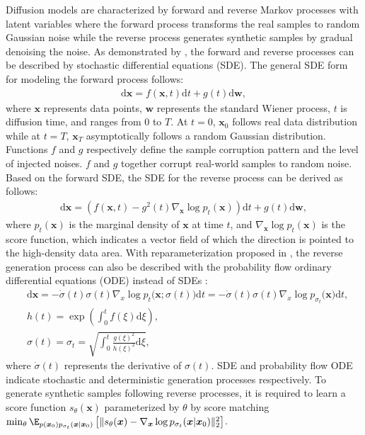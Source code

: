 Diffusion models are characterized by forward and reverse Markov processes with latent variables where the forward process transforms the real samples to random Gaussian noise while the reverse process generates synthetic samples by gradual denoising the noise. As demonstrated by \citet{song2021scorebased}, the forward and reverse processes can be described by stochastic differential equations (SDE). The general SDE form for modeling the forward process follows:
\begin{align}
    \mathrm{d}\boldsymbol{x} = f(\boldsymbol{x}, t)\mathrm{d}t + g(t)\mathrm{d}\boldsymbol{w},
\end{align}
where $\boldsymbol{x}$ represents data points, $\boldsymbol{w}$ represents the standard Wiener process, $t$ is diffusion time, and ranges from $0$ to $T$. At $t=0$, $\boldsymbol{x}_0$ follows real data distribution while at $t=T$, $\boldsymbol{x}_T$ asymptotically follows a random Gaussian distribution. Functions $f$ and $g$ respectively define the sample corruption pattern and the level of injected noises. $f$ and $g$ together corrupt real-world samples to random noise. Based on the forward SDE, the SDE for the reverse process can be derived as follows:
\begin{align}
    \mathrm{d}\boldsymbol{x} = \left(f(\boldsymbol{x}, t)-g^2(t)\nabla_{\boldsymbol{x}}\log p_t(\boldsymbol{x})\right)\mathrm{d}t + g(t)\mathrm{d}\boldsymbol{w},
\end{align}
where $p_t(\boldsymbol{x})$ is the marginal density of $\boldsymbol{x}$ at time $t$, and $\nabla_{\boldsymbol{x}}\log p_t(\boldsymbol{x})$ is the score function, which indicates a vector field of which the direction is pointed to the high-density data area. 
With reparameterization proposed in \citet{Karras2022edm}, the reverse generation process can also be described with the probability flow ordinary differential equations (ODE) instead of SDEs \citep{song2021scorebased}:
\begin{align}
    &\mathrm{d}\boldsymbol{x}=-\dot{\sigma}(t)\sigma(t)\nabla_{x}\log p_t\big( \boldsymbol{x};\sigma(t) \big)\mathrm{d}t=-\dot{\sigma}(t)\sigma(t)\nabla_{x}\log p_{\sigma_t}\big( \boldsymbol{x} \big)\mathrm{d}t, \\
    &h(t)=\exp\left(\int_{0}^{t}f(\xi)\mathrm{d}\xi\right),\\
&\sigma(t)=\sigma_t=\sqrt{\int_{0}^t\frac{g(\xi)^2}{h(\xi)^2}\mathrm{d}\xi},
\label{odefin}
\end{align}
where $\dot{\sigma}(t)$ represents the derivative of $\sigma(t)$.
SDE and probability flow ODE indicate stochastic and deterministic generation processes respectively. To generate synthetic samples following reverse processes, it is required to learn a score function $s_\theta(\boldsymbol{x})$ parameterized by $\theta$ by score matching $\min_\theta \E_{p(\boldsymbol{x}_0)p_{\sigma_t}(\boldsymbol{x}|\boldsymbol{x}_0)}\left[\|s_\theta(\boldsymbol{x}) - \nabla_{\boldsymbol{x}}\log p_{\sigma_t}(\boldsymbol{x}|\boldsymbol{x}_0)\|^2_2\right]$.

